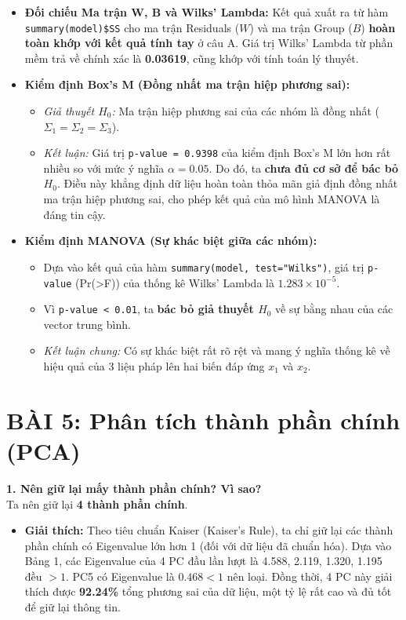 \documentclass[12pt, a4paper]{article}
\begin{document}
\begin{itemize}
    \item \textbf{Đối chiếu Ma trận W, B và Wilks' Lambda:} 
    Kết quả xuất ra từ hàm \texttt{summary(model)\$SS} cho ma trận Residuals ($W$) và ma trận Group ($B$) \textbf{hoàn toàn khớp với kết quả tính tay} ở câu A. Giá trị Wilks' Lambda từ phần mềm trả về chính xác là \textbf{0.03619}, cũng khớp với tính toán lý thuyết.
    
    \item \textbf{Kiểm định Box's M (Đồng nhất ma trận hiệp phương sai):}
    \begin{itemize}
        \item \textit{Giả thuyết $H_0$:} Ma trận hiệp phương sai của các nhóm là đồng nhất ($\Sigma_1 = \Sigma_2 = \Sigma_3$).
        \item \textit{Kết luận:} Giá trị \texttt{p-value = 0.9398} của kiểm định Box's M lớn hơn rất nhiều so với mức ý nghĩa $\alpha = 0.05$. Do đó, ta \textbf{chưa đủ cơ sở để bác bỏ $H_0$}. Điều này khẳng định dữ liệu hoàn toàn thỏa mãn giả định đồng nhất ma trận hiệp phương sai, cho phép kết quả của mô hình MANOVA là đáng tin cậy.
    \end{itemize}
    
    \item \textbf{Kiểm định MANOVA (Sự khác biệt giữa các nhóm):}
    \begin{itemize}
        \item Dựa vào kết quả của hàm \texttt{summary(model, test="Wilks")}, giá trị \texttt{p-value} (Pr(>F)) của thống kê Wilks' Lambda là \textbf{$1.283 \times 10^{-5}$}.
        \item Vì \texttt{p-value < 0.01}, ta \textbf{bác bỏ giả thuyết $H_0$} về sự bằng nhau của các vector trung bình.
        \item \textit{Kết luận chung:} Có sự khác biệt rất rõ rệt và mang ý nghĩa thống kê về hiệu quả của 3 liệu pháp lên hai biến đáp ứng $x_1$ và $x_2$.
    \end{itemize}
\end{itemize}

\section*{BÀI 5: Phân tích thành phần chính (PCA)}

\textbf{1. Nên giữ lại mấy thành phần chính? Vì sao?}
\\
Ta nên giữ lại \textbf{4 thành phần chính}.
\begin{itemize}
    \item \textbf{Giải thích:} Theo tiêu chuẩn Kaiser (Kaiser's Rule), ta chỉ giữ lại các thành phần chính có Eigenvalue lớn hơn 1 (đối với dữ liệu đã chuẩn hóa). Dựa vào Bảng 1, các Eigenvalue của 4 PC đầu lần lượt là 4.588, 2.119, 1.320, 1.195 đều $> 1$. PC5 có Eigenvalue là $0.468 < 1$ nên loại. Đồng thời, 4 PC này giải thích được \textbf{92.24\%} tổng phương sai của dữ liệu, một tỷ lệ rất cao và đủ tốt để giữ lại thông tin.
\end{itemize}
\end{document}
